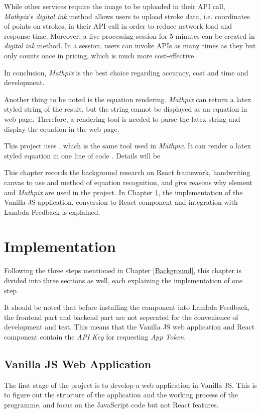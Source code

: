 \documentclass[12pt,twoside]{report}
\begin{document}
While other services require the image to be uploaded in their API call,
\textit{Mathpix}'s \textit{digital ink} method allows users to upload stroke
data, i.e. coordinates of points on strokes, in their API call in order to
reduce network load and response time. Moreover, a live processing session for 5
minutes can be created in \textit{digital ink} method. In a session, users can
invoke APIs as many times as they but only counts once in pricing, which is much
more cost-effective.

In conclusion, \textit{Mathpix} is the best choice regarding accuracy, cost and time and development.

Another thing to be noted is the equation rendering. \textit{Mathpix} can return a latex styled string of the result, but the string cannot be displayed as an equation in web page. Therefore, a rendering tool is needed to parse the latex string and display the equation in the web page. 

This project uses , which is the same tool used in \textit{Mathpix}. It can render a latex styled equation in one line of code \cite{web:katexapi}. Details will be 

This chapter records the background research on React framework, handwriting canvas to use and method of equation recognition, and givs reasons why  element and \textit{Mathpix} are used in the project. In Chapter \ref{Implementation}, the implementation of the Vanilla JS application, conversion to React component and integration with Lambda Feedback is explained.



\chapter{Implementation}
\label{Implementation}

Following the three steps mentioned in Chapter \ref{Background}, this chapter is divided into three sections as well, each explaining the implementation of one step.

It should be noted that before installing the component into Lambda Feedback, the frontend part and backend part are not seperated for the convenience of development and test. This means that the Vanilla JS web application and React component contain the \textit{API Key} for requesting \textit{App Token}.

\section{Vanilla JS Web Application}
The first stage of the project is to develop a web application in Vanilla JS. This is to figure out the structure of the application and the working process of the programme, and focus on the JavaScript code but not React features.
\end{document}
